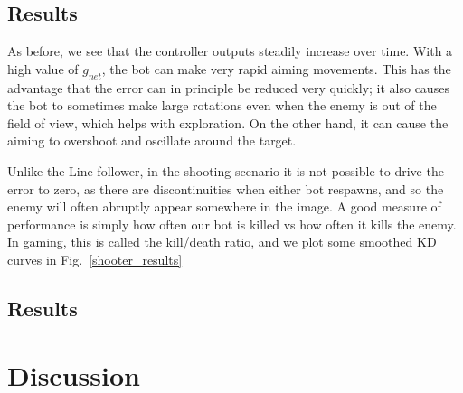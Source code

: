 \documentclass{llncs}
\begin{document}
\subsection{Results}

As before, we see that the controller outputs steadily increase over time. With a high value of $g_{net}$, the bot can make very rapid aiming movements. This has the advantage that the error can in principle be reduced very quickly; it also causes the bot to sometimes make large rotations even when the enemy is out of the field of view, which helps with exploration. On the other hand, it can cause the aiming to overshoot and oscillate around the target. 

Unlike the Line follower, in the shooting scenario it is not possible to drive the error to zero, as there are discontinuities when either bot respawns, and so the enemy will often abruptly appear somewhere in the image. A good measure of performance is simply how often our bot is killed vs how often it kills the enemy. In gaming, this is called the kill/death ratio, and we plot some smoothed KD curves in Fig.~\ref{shooter_results}



\subsection{Results}


\section{Discussion}




\end{document}
